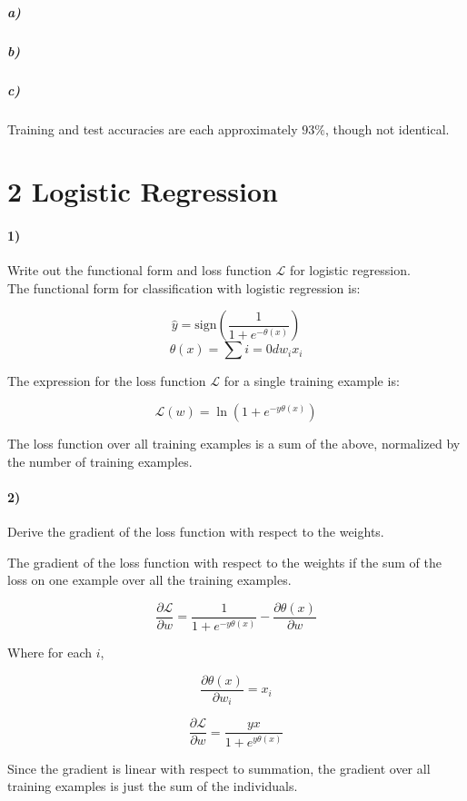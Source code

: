 \documentclass[10pt,letter]{article}
\begin{document}
\subparagraph{a)}

\subparagraph{b)}

\subparagraph{c)} Training and test accuracies are each approximately $93\%$, though not identical.

\section*{2 Logistic Regression}

\paragraph{1)} Write out the functional form and loss function $\mathcal{L}$ for logistic regression.\\

The functional form for classification with logistic regression is:

\[ \hat{y} = \text{sign}(\frac{1}{1 + e^{-\theta(x)}}) \]
\[ \theta(x) = \sum{i=0}{d}{w_ix_i} \]

The expression for the loss function $\mathcal{L}$ for a single training example is:

\[ \mathcal{L}(w) = \ln(1 + e^{-y\theta(x)}) \]

The loss function over all training examples is a sum of the above, normalized by the number of 
training examples.

\paragraph{2)} Derive the gradient of the loss function with respect to the weights.

The gradient of the loss function with respect to the weights if the sum of the loss on one example 
over all the training examples.

\[ \frac{\partial \mathcal{L}}{\partial w} = \frac{1}{1 + e^{-y\theta(x)}} -\frac{\partial \theta(x)}
{\partial w} \]

Where for each $i$,

\[ \frac{\partial\theta(x)}{\partial w_i} = x_i \]

\[ \frac{\partial \mathcal{L}}{\partial w} = \frac{yx}{1 + e^{y\theta(x)}} \]

Since the gradient is linear with respect to summation, the gradient over all training examples is just the sum of the individuals.
\end{document}
